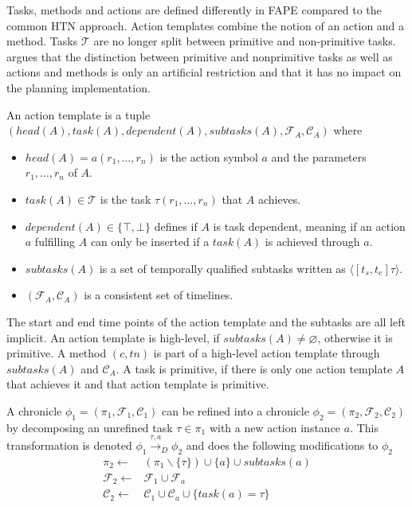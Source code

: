 Tasks, methods and actions are defined differently in \ac{FAPE} compared to the common \ac{HTN} approach.
Action templates combine the notion of an action and a method.
Tasks $\mathcal{T}$ are no longer split between primitive and non-primitive tasks.
\cite{bit-monnotTemporalHierarchicalModels2016a} argues that the distinction between primitive and nonprimitive tasks as well as actions and methods is only an artificial restriction and that it has no impact on the planning implementation.

\begin{definition}
  An action template is a tuple \\ $(head(A), task(A), dependent(A), subtasks(A), \mathcal{F}_A, \mathcal{C}_A)$ where
  \begin{itemize}
    \item $head(A) = a(r_1,\dots,r_n)$ is the action symbol $a$ and the parameters $r_1,\dots,r_n$ of $A$.
    \item $task(A) \in \mathcal{T}$ is the task $\tau(r_1,\dots,r_n)$ that $A$ achieves.
    \item $dependent(A) \in \{\top,\bot\}$ defines if $A$ is task dependent, meaning if an action $a$ fulfilling $A$ can only be inserted if a $task(A)$ is achieved through $a$.
    \item $subtasks(A)$ is a set of temporally qualified subtasks written as $\langle[t_s,t_e] \tau\rangle$.
    \item $(\mathcal{F}_A, \mathcal{C}_A)$ is a consistent set of timelines.
  \end{itemize}
\end{definition}

The start and end time points of the action template and the subtasks are all left implicit.
An action template is high-level, if $subtasks(A) \neq \varnothing$, otherwise it is primitive.
A method $(c,tn)$ is part of a high-level action template through $subtasks(A)$ and $\mathcal{C}_A$.
A task is primitive, if there is only one action template $A$ that achieves it and that action template is primitive.

\begin{definition}
  A chronicle $\phi_1 = (\pi_1,\mathcal{F}_1,\mathcal{C}_1)$ can be refined into a chronicle $\phi_2 = (\pi_2,\mathcal{F}_2,\mathcal{C}_2)$ by decomposing an unrefined task $\tau \in \pi_1$ with a new action instance $a$. This transformation is denoted $\phi_1 \xrightarrow{\tau,a}_D \phi_2$ and does the following modifications to $\phi_2$
  \begin{align*}
    \pi_2 \leftarrow & (\pi_1  \backslash \{\tau\}) \cup \{a\} \cup subtasks(a) \\
    \mathcal{F}_2 \leftarrow & \mathcal{F}_1 \cup \mathcal{F}_a \\
    \mathcal{C}_2 \leftarrow & \mathcal{C}_1 \cup \mathcal{C}_a \cup \{task(a) = \tau\} \\
  \end{align*}
  \label{def:htn-task-dec-fape}
\end{definition}

